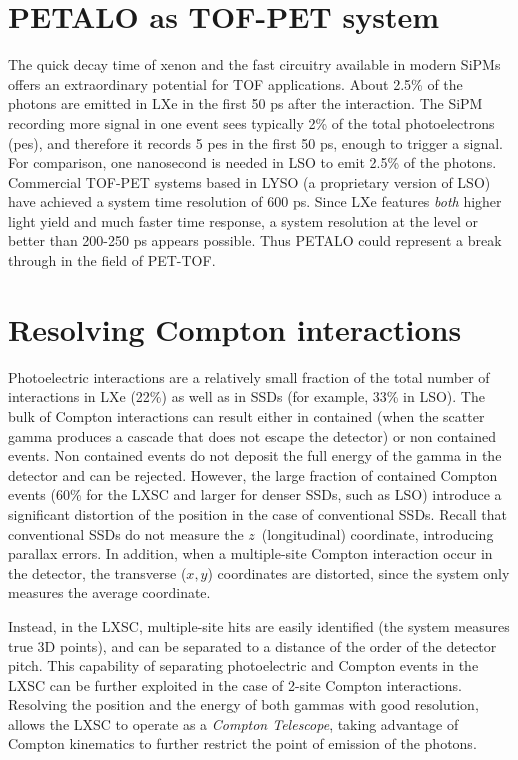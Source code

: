\documentclass{JINST}
\begin{document}
\section{PETALO as TOF-PET system}
\label{sec.tof}


The quick decay time of xenon and the fast circuitry available in modern SiPMs offers an extraordinary potential for TOF applications. About 2.5\% of the photons are emitted in LXe in the first 50 ps after the interaction. The SiPM recording more signal in one event sees typically  2\% of the total photoelectrons (pes), and therefore it records 5 pes in the first 50 ps, enough to trigger a signal. For comparison, one nanosecond is needed in LSO to emit 2.5\% of the photons. Commercial TOF-PET systems based in LYSO (a proprietary version of LSO) have achieved a system time resolution of 600 ps. Since LXe features {\em both} higher light yield and much faster time response, a system resolution at the level or better than 200-250 ps appears possible. Thus PETALO could represent a break through in the field of PET-TOF. 

\section{Resolving Compton interactions}
\label{sec.comp}

Photoelectric interactions are a relatively small fraction of the total number of interactions in LXe (22\%) as well as in SSDs (for example, 33\% in LSO). The bulk of Compton interactions can result either in contained (when the scatter gamma produces a cascade that does not escape the detector) or non contained events. Non contained events do not deposit the full energy of the gamma in the detector and can be rejected. However, the large fraction of contained Compton events (60\% for the LXSC and larger for denser SSDs, such as LSO) introduce a significant distortion of the position in the case of conventional SSDs. Recall that conventional SSDs do not measure the $z$~(longitudinal) coordinate, introducing parallax errors. In addition, when a multiple-site Compton interaction occur in the detector, the transverse ($x,y$) coordinates are distorted, since the system only measures the average coordinate. 

Instead, in the LXSC, multiple-site hits are easily identified (the system measures true 3D points), and can be separated to a distance of the order of the detector pitch. This capability of separating photoelectric and Compton events in the LXSC can be further exploited in the case of 2-site Compton interactions. Resolving the position and the energy of both gammas with good resolution, allows the LXSC to operate as a {\em Compton Telescope}, taking advantage of Compton kinematics to further restrict the point of emission of the photons. 
\end{document}
